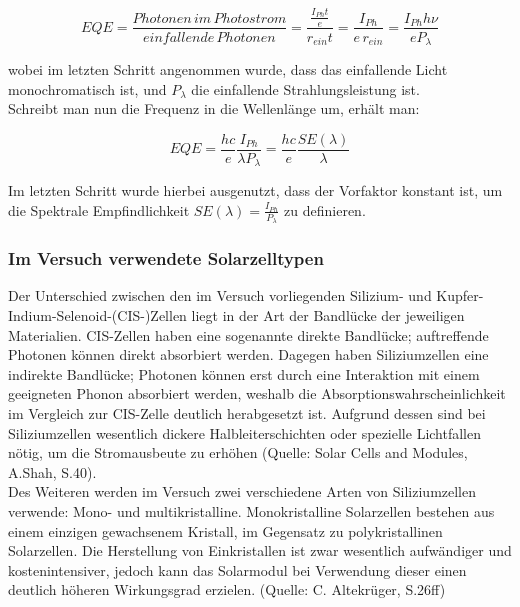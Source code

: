 \begin{equation}
EQE = \frac{Photonen \, im \, Photostrom}{einfallende \, Photonen} = \frac{ \frac{I_{Ph}t}{e}}{r_{ein}t} = \frac{I_{Ph}}{e \, r_{ein}} = \frac{I_{Ph} h \nu}{e P_\lambda}
\end{equation}

wobei im letzten Schritt angenommen wurde, dass das einfallende Licht monochromatisch ist, und $P_\lambda$ die einfallende Strahlungsleistung ist. \\
Schreibt man nun die Frequenz in die Wellenlänge um, erhält man:

\begin{equation}
EQE = \frac{h c}{e} \frac{I_{Ph}}{\lambda P_\lambda} = \frac{h c}{e} \frac{SE(\lambda)}{\lambda}
\end{equation}

Im letzten Schritt wurde hierbei ausgenutzt, dass der Vorfaktor konstant ist, um die Spektrale Empfindlichkeit $SE(\lambda) = \frac{I_{Ph}}{P_\lambda}$ zu definieren.

\subsubsection{Im Versuch verwendete Solarzelltypen}
Der Unterschied zwischen den im Versuch vorliegenden Silizium- und Kupfer-Indium-Selenoid-(CIS-)Zellen liegt in der Art der Bandlücke der jeweiligen Materialien. CIS-Zellen haben eine sogenannte direkte Bandlücke; auftreffende Photonen können direkt absorbiert werden. Dagegen haben Siliziumzellen eine indirekte Bandlücke; Photonen können erst durch eine Interaktion mit einem geeigneten Phonon absorbiert werden, weshalb die Absorptionswahrscheinlichkeit im Vergleich zur CIS-Zelle deutlich herabgesetzt ist. Aufgrund dessen sind bei Siliziumzellen wesentlich dickere Halbleiterschichten oder spezielle Lichtfallen nötig, um die Stromausbeute zu erhöhen (Quelle: Solar Cells and Modules, A.Shah, S.40). \\
Des Weiteren werden im Versuch zwei verschiedene Arten von Siliziumzellen verwende: Mono- und multikristalline. Monokristalline Solarzellen bestehen aus einem einzigen gewachsenem Kristall, im Gegensatz zu polykristallinen Solarzellen. Die Herstellung von Einkristallen ist zwar wesentlich aufwändiger und kostenintensiver, jedoch kann das Solarmodul bei Verwendung dieser einen deutlich höheren Wirkungsgrad erzielen. (Quelle: C. Altekrüger, S.26ff)
